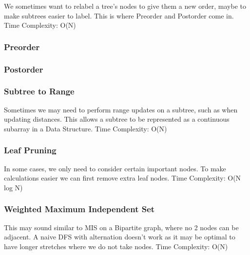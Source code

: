 \documentclass{article}
\begin{document}
\begin{flushleft}
We sometimes want to relabel a tree's nodes to give them a new order,
maybe to make subtrees easier to label. This is where Preorder and
Postorder come in.
\newline
Time Complexity: O(N)
\end{flushleft}
\subsubsection{Preorder}

\subsubsection{Postorder}


\subsubsection{Subtree to Range}
\begin{flushleft}
Sometimes we may need to perform range updates on a subtree, such
as when updating distances. This allows a subtree to be represented as
a continuous subarray in a Data Structure.
\newline
Time Complexity: O(N)
\end{flushleft}


\subsubsection{Leaf Pruning}
\begin{flushleft}
In some cases, we only need to consider certain important nodes.
To make calculations easier we can first remove extra leaf nodes.
\newline
Time Complexity: O(N log N)
\end{flushleft}


\subsubsection{Weighted Maximum Independent Set}\begin{flushleft}
This may sound similar to MIS on a Bipartite graph, where no 2 nodes can be adjacent.
A naive DFS with alternation doesn't work as it may be optimal
to have longer stretches where we do not take nodes.
\newline
Time Complexity: O(N)
\end{flushleft}

\end{document}
